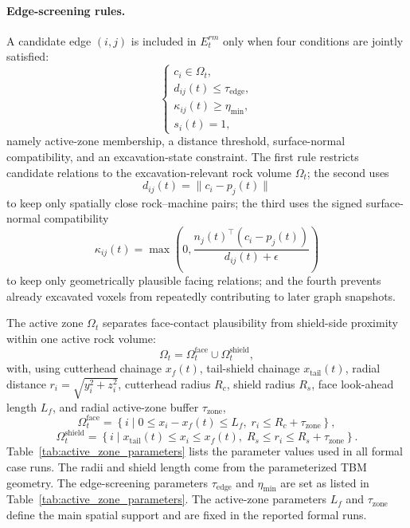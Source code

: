 \paragraph{Edge-screening rules.} A candidate edge $(i,j)$ is included in
$E_t^{rm}$ only when four conditions are jointly satisfied:
\[
\begin{cases}
c_i\in\Omega_t,\\
d_{ij}(t)\leq \tau_{\mathrm{edge}},\\
\kappa_{ij}(t)\geq \eta_{\min},\\
s_i(t)=1,
\end{cases}
\]
namely active-zone membership, a distance threshold, surface-normal
compatibility, and an excavation-state constraint. The first rule restricts
candidate relations to the excavation-relevant rock volume $\Omega_t$; the
second uses
\[
d_{ij}(t)=\|c_i-p_j(t)\|
\]
to keep only spatially close rock--machine pairs; the third uses the signed
surface-normal compatibility
\[
\kappa_{ij}(t)=
\max\left(0,\frac{n_j(t)^\top(c_i-p_j(t))}{d_{ij}(t)+\epsilon}\right)
\]
to keep only geometrically plausible facing relations; and the fourth prevents
already excavated voxels from repeatedly contributing to later graph snapshots.

The active zone $\Omega_t$ separates face-contact plausibility from
shield-side proximity within one active rock volume:
\[
\Omega_t=\Omega_t^{\mathrm{face}}\cup\Omega_t^{\mathrm{shield}} ,
\]
with, using cutterhead chainage $x_f(t)$, tail-shield chainage
$x_{\mathrm{tail}}(t)$, radial distance $r_i=\sqrt{y_i^2+z_i^2}$, cutterhead
radius $R_c$, shield radius $R_s$, face look-ahead length $L_f$, and radial
active-zone buffer $\tau_{\mathrm{zone}}$,
\[
\Omega_t^{\mathrm{face}}=
\left\{i \mid 0 \leq x_i-x_f(t) \leq L_f,\;
r_i \leq R_c+\tau_{\mathrm{zone}}\right\},
\]
\[
\Omega_t^{\mathrm{shield}}=
\left\{i \mid x_{\mathrm{tail}}(t)\leq x_i\leq x_f(t),\;
R_s \leq r_i \leq R_s+\tau_{\mathrm{zone}}\right\}.
\]
Table~\ref{tab:active_zone_parameters} lists the parameter values used in all
formal case runs. The radii and shield length come from the parameterized TBM
geometry. The edge-screening parameters $\tau_{\mathrm{edge}}$ and
$\eta_{\min}$ are set as listed in Table~\ref{tab:active_zone_parameters}. The
active-zone parameters $L_f$ and $\tau_{\mathrm{zone}}$ define the main
spatial support and are fixed in the reported formal runs.


